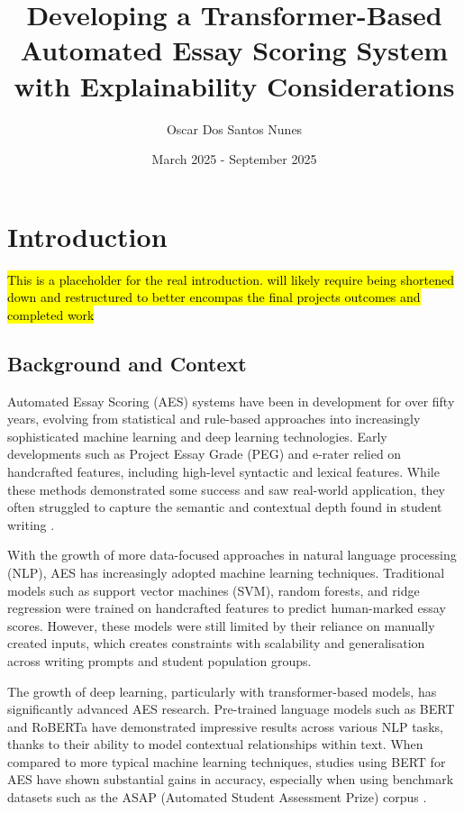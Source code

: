 \documentclass[8pt]{report}
\begin{document}
\title{Developing a Transformer-Based Automated Essay Scoring System with Explainability Considerations}
\author{Oscar Dos Santos Nunes}
\date{March 2025 - September 2025}
\maketitle

\tableofcontents
\newpage


\chapter{Introduction}
\hl{This is a placeholder for the real introduction. will likely require being shortened down and restructured to better encompas the final projects outcomes and completed work}
\section{Background and Context}
Automated Essay Scoring (AES) systems have been in development for over fifty years, evolving from statistical and rule-based approaches into increasingly sophisticated machine learning and deep 
learning technologies. Early developments such as Project Essay Grade (PEG) \parencite{page1966imminence} and e-rater \parencite{attali2006e_rater} relied on handcrafted features, including high-level 
syntactic and lexical features. While these methods demonstrated some success and saw real-world application, they often struggled to capture the semantic and contextual depth found in student writing 
\parencite{shermis2013handbook}.

With the growth of more data-focused approaches in natural language processing (NLP), AES has increasingly adopted machine learning techniques. Traditional models such as support vector machines (SVM), 
random forests, and ridge regression were trained on handcrafted features to predict human-marked essay scores. However, these models were still limited by their reliance on manually created inputs, 
which creates constraints with scalability and generalisation across writing prompts and student population groups.

The growth of deep learning, particularly with transformer-based models, has significantly advanced AES research. Pre-trained language models such as BERT \parencite{devlin2019bert} and RoBERTa 
\parencite{liu2019roberta} have demonstrated impressive results across various NLP tasks, thanks to their ability to model contextual relationships within text. When compared to more typical 
machine learning techniques, studies using BERT for AES have shown substantial gains in accuracy, especially when using benchmark datasets such as the ASAP (Automated Student Assessment Prize) 
corpus \parencite{taghipour2016neural}.
\end{document}

